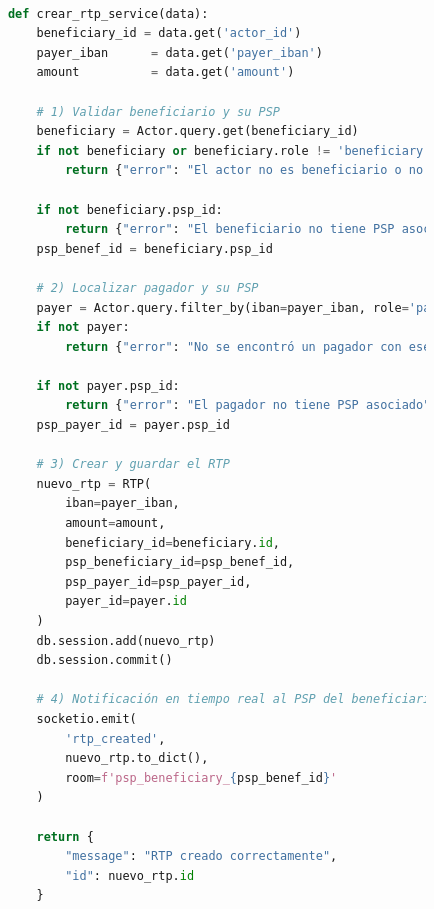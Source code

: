\begin{itemize}
       \begin{lstlisting}[language=Python, style=custom]

            def crear_rtp_service(data):
                beneficiary_id = data.get('actor_id')
                payer_iban      = data.get('payer_iban')
                amount          = data.get('amount')

                # 1) Validar beneficiario y su PSP
                beneficiary = Actor.query.get(beneficiary_id)
                if not beneficiary or beneficiary.role != 'beneficiary':
                    return {"error": "El actor no es beneficiario o no existe"}

                if not beneficiary.psp_id:
                    return {"error": "El beneficiario no tiene PSP asociado"}
                psp_benef_id = beneficiary.psp_id

                # 2) Localizar pagador y su PSP
                payer = Actor.query.filter_by(iban=payer_iban, role='payer').first()
                if not payer:
                    return {"error": "No se encontró un pagador con ese IBAN"}

                if not payer.psp_id:
                    return {"error": "El pagador no tiene PSP asociado"}
                psp_payer_id = payer.psp_id

                # 3) Crear y guardar el RTP
                nuevo_rtp = RTP(
                    iban=payer_iban,
                    amount=amount,
                    beneficiary_id=beneficiary.id,
                    psp_beneficiary_id=psp_benef_id,
                    psp_payer_id=psp_payer_id,
                    payer_id=payer.id
                )
                db.session.add(nuevo_rtp)
                db.session.commit()

                # 4) Notificación en tiempo real al PSP del beneficiario
                socketio.emit(
                    'rtp_created',
                    nuevo_rtp.to_dict(),
                    room=f'psp_beneficiary_{psp_benef_id}'
                )

                return {
                    "message": "RTP creado correctamente",
                    "id": nuevo_rtp.id
                }
        \end{lstlisting}


\end{itemize}
